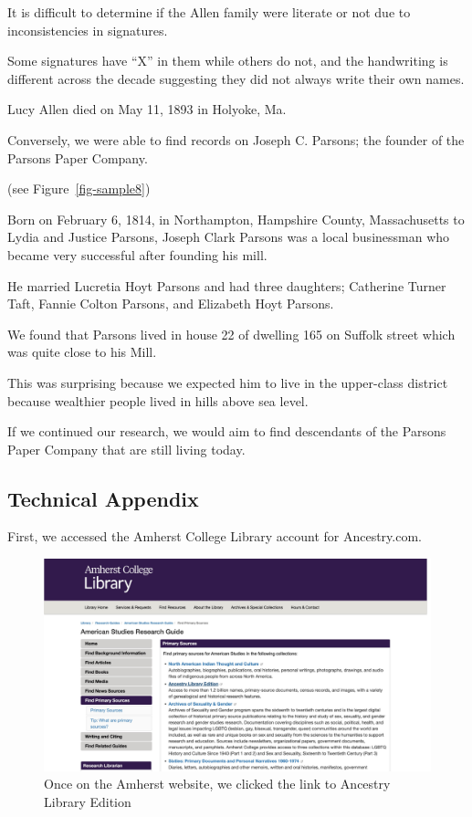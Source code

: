 \documentclass[
  letterpaper,
  DIV=11,
  numbers=noendperiod]{scrartcl}
\begin{document}
It is difficult to determine if the Allen family were literate or not
due to inconsistencies in signatures.

Some signatures have ``X'' in them while others do not, and the
handwriting is different across the decade suggesting they did not
always write their own names.

Lucy Allen died on May 11, 1893 in Holyoke, Ma.

\newpage{}

Conversely, we were able to find records on Joseph C. Parsons; the
founder of the Parsons Paper Company.

(see Figure~\ref{fig-sample8})

Born on February 6, 1814, in Northampton, Hampshire County,
Massachusetts to Lydia and Justice Parsons, Joseph Clark Parsons was a
local businessman who became very successful after founding his mill.

He married Lucretia Hoyt Parsons and had three daughters; Catherine
Turner Taft, Fannie Colton Parsons, and Elizabeth Hoyt Parsons.

We found that Parsons lived in house 22 of dwelling 165 on Suffolk
street which was quite close to his Mill.

This was surprising because we expected him to live in the upper-class
district because wealthier people lived in hills above sea level.~

If we continued our research, we would aim to find descendants of the
Parsons Paper Company that are still living today.

\newpage{}

\hypertarget{technical-appendix}{%
\subsection{\texorpdfstring{\textbf{Technical
Appendix}}{Technical Appendix}}\label{technical-appendix}}

First, we accessed the Amherst College Library account for Ancestry.com.

\begin{figure}

{\centering \includegraphics[width=\textwidth,height=0.3\textheight]{amherst_website.png}

}

\caption{\label{fig-sample1}Once on the Amherst website, we clicked the
link to Ancestry Library Edition}

\end{figure}
\end{document}
